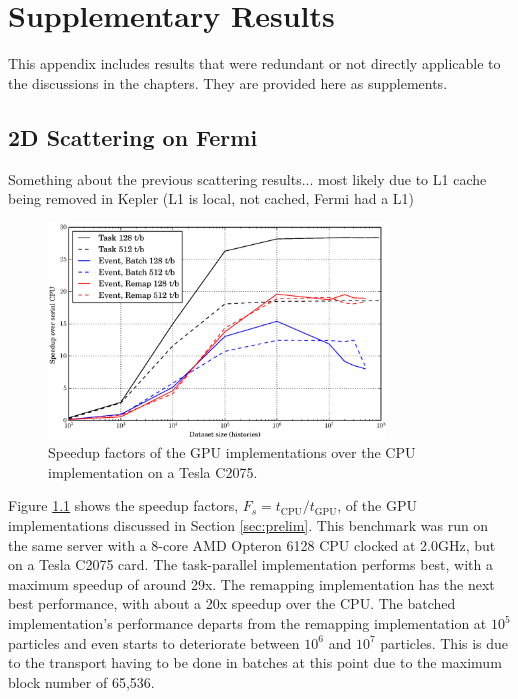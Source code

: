 \chapter{Supplementary Results}
\label{app:A}

This appendix includes results that were redundant or not directly applicable to the discussions in the chapters.  They are provided here as supplements.

\section{2D Scattering on Fermi}

Something about the previous scattering results...  most likely due to L1 cache being removed in Kepler (L1 is local, not cached, Fermi had a L1)

\begin{figure}[h!] 
  \centering
    \includegraphics[width=0.8\textwidth]{graphics/prelim_speedup_old.eps}
     \caption{Speedup factors of the GPU implementations over the CPU implementation on a Tesla C2075. \label{prelim_speedup_old} }
\end{figure}

Figure \ref{prelim_speedup_old} shows the speedup factors, $F_s=t_\mathrm{CPU}/t_\mathrm{GPU}$, of the GPU implementations discussed in Section \ref{sec:prelim}.  This benchmark was run on the same server with a 8-core AMD Opteron 6128 CPU clocked at 2.0GHz, but on a Tesla C2075 card.  The task-parallel implementation performs best, with a maximum speedup of around 29x.  The remapping implementation has the next best performance, with about a 20x speedup over the CPU. The batched implementation's performance departs from the remapping implementation at $10^5$ particles and even starts to deteriorate between $10^6$ and $10^7$ particles.  This is due to the transport having to be done in batches at this point due to the maximum block number of 65,536.

